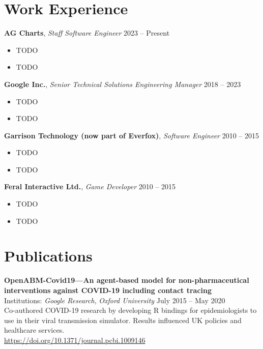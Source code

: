 \documentclass[a4paper,10pt]{article}
\begin{document}
{\begin{minipage}[t]{0.72\textwidth}
    \section*{\color{navy} Work Experience}
    \textbf{AG Charts}, \textit{Staff Software Engineer} \hfill 2023 -- Present
    \begin{itemize}[leftmargin=1.5em, nosep]
        \item TODO
        \item TODO
    \end{itemize}
    \vspace{0.5em}
    \textbf{Google Inc.}, \textit{Senior Technical Solutions Engineering Manager} \hfill 2018 -- 2023
    \begin{itemize}[leftmargin=1.5em, nosep]
        \item TODO
        \item TODO
    \end{itemize}
    \vspace{0.5em}
    \textbf{Garrison Technology (now part of Everfox)}, \textit{Software Engineer} \hfill 2010 -- 2015
    \begin{itemize}[leftmargin=1.5em, nosep]
        \item TODO
        \item TODO
    \end{itemize}
    \vspace{0.5em}
    \textbf{Feral Interactive Ltd.}, \textit{Game Developer} \hfill 2010 -- 2015
    \begin{itemize}[leftmargin=1.5em, nosep]
        \item TODO
        \item TODO
    \end{itemize}
    \section*{\color{navy} Publications}
    \textbf{OpenABM-Covid19—An agent-based model for non-pharmaceutical interventions against COVID-19 including contact tracing}\\
    Institutions: \textit{Google Research}, \textit{Oxford University} \hfill July 2015 -- May 2020\\[1.0em]
    Co-authored COVID-19 research by developing R bindings for epidemiologists to use in their viral transmission simulator. Results influenced UK policies and healthcare services.\\
    \href{https://doi.org/10.1371/journal.pcbi.1009146}{https://doi.org/10.1371/journal.pcbi.1009146}
\end{minipage}%
\vfill %
}%
\end{document}
